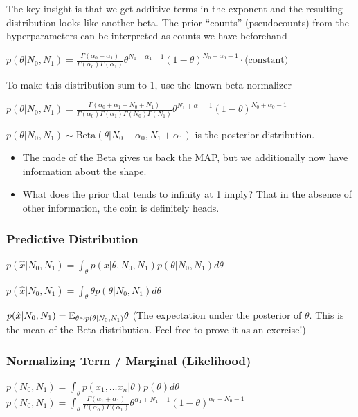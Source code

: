 \documentclass{article}
\begin{document}
The key insight is that we get additive terms in the exponent and the resulting distribution looks like another beta. The prior ``counts'' (pseudocounts) from the hyperparameters can be interpreted as counts we have beforehand

$p(\theta|N_0,N_1) = \frac{\Gamma(\alpha_0 + \alpha_1)}{\Gamma(\alpha_0)\Gamma(\alpha_1)} \theta^{N_1 + \alpha_1-1} (1-\theta)^{N_0 + \alpha_0-1} \cdot \textrm{(constant)}$ 

To make this distribution sum to 1, use the known beta normalizer

$p(\theta|N_0,N_1) = \frac{\Gamma(\alpha_0 + \alpha_1 + N_0 + N_1)}{\Gamma(\alpha_0)\Gamma(\alpha_1)\Gamma(N_0)\Gamma(N_1)} \theta^{N_1 + \alpha_1-1} (1-\theta)^{N_0 + \alpha_0-1} $ 

$p(\theta|N_0,N_1) \sim \textrm{Beta}(\theta | N_0 + \alpha_0, N_1 + \alpha_1)$ is the posterior distribution.

\begin{itemize}
\item The mode of the Beta gives us back the MAP, but we additionally now have information about the shape.
\item What does the prior that tends to infinity at 1 imply? That in the absence of other information, the coin is definitely heads. 
\end{itemize}

\subsubsection*{Predictive Distribution}

$p(\hat{x}| N_0, N_1) = \int_\theta p(x|\theta, N_0, N_1) p(\theta | N_0, N_1) d\theta$

$p(\hat{x}| N_0, N_1) = \int_\theta \theta p(\theta | N_0, N_1) d\theta$

$p(\hat{x}| N_0, N_1) = \mathbb{E}_{\theta \sim p(\theta|N_0, N_1)} \theta$ (The expectation under the posterior of $\theta$. This is the mean of the Beta distribution. Feel free to prove it as an exercise!)

\subsubsection*{Normalizing Term / Marginal (Likelihood)}
$p(N_0, N_1) = \int_\theta p(x_1, \hdots x_n | \theta) p(\theta) d\theta$ \\
$p(N_0, N_1) = \int_\theta \frac{\Gamma( \alpha_1 +  \alpha_1)}{\Gamma(\alpha_0)\Gamma(\alpha_1)} \theta^{\alpha_1 + N_1 -1} (1-\theta)^{\alpha_0+N_0-1} $
\end{document}

